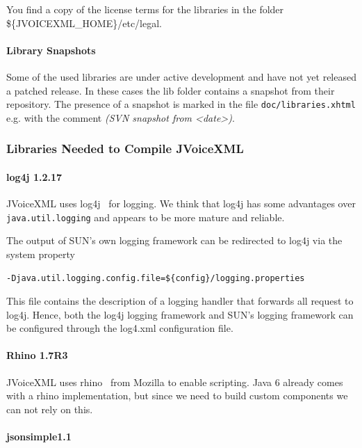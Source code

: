 \documentclass[11pt,a4paper]{article}
\begin{document}
You find a copy of the license terms for the libraries in the folder\\
\$\{JVOICEXML\_HOME\}/etc/legal.

\paragraph{Library Snapshots}

Some of the used libraries are under active development and have not yet
released a patched release. In these cases the lib folder contains a snapshot
from their repository. The presence of a snapshot is marked in the file
\texttt{doc/libraries.xhtml} e.g. with the comment \emph{(SVN snapshot from
<date>)}.

\subsubsection{Libraries Needed to Compile JVoiceXML}
\label{sec:libr-need-comp}

\paragraph{log4j 1.2.17}

JVoiceXML uses log4j~\cite{apache:log4j} for logging. We think that log4j has 
some advantages
over \texttt{java.util.logging} and appears to be more mature and reliable.

The output of SUN's own logging framework can be redirected to log4j via the
system property
\begin{lstlisting}
-Djava.util.logging.config.file=${config}/logging.properties
\end{lstlisting}

This file contains the description of a logging handler that forwards all
request to log4j. Hence, both the log4j logging framework and SUN's logging
framework can be configured through the log4.xml configuration file.

\paragraph{Rhino 1.7R3}

JVoiceXML uses rhino~\cite{rhino} from Mozilla to enable scripting.
Java 6 already comes with a rhino implementation, but since we need to
build custom components we can not rely on this.

\paragraph{jsonsimple1.1}
\end{document}
